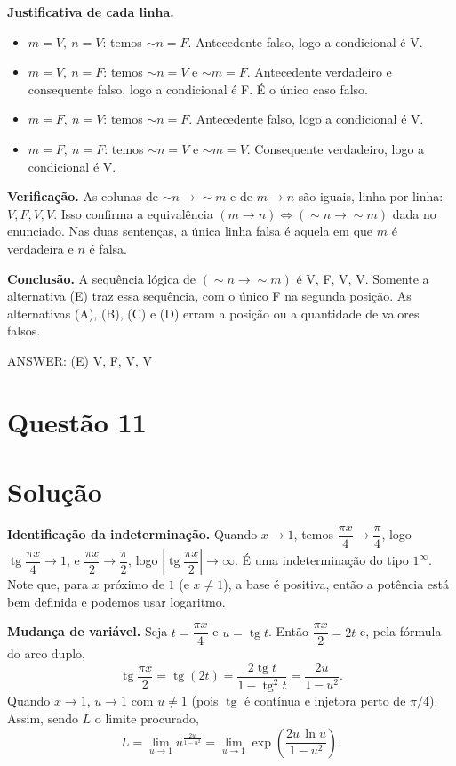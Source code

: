 \documentclass{article}%
\begin{document}
\textbf{Justificativa de cada linha.}
\begin{itemize}
\item $m=V,\ n=V$: temos $\sim n=F$. Antecedente falso, logo a condicional é V.
\item $m=V,\ n=F$: temos $\sim n=V$ e $\sim m=F$. Antecedente verdadeiro e consequente falso, logo a condicional é F. É o único caso falso.
\item $m=F,\ n=V$: temos $\sim n=F$. Antecedente falso, logo a condicional é V.
\item $m=F,\ n=F$: temos $\sim n=V$ e $\sim m=V$. Consequente verdadeiro, logo a condicional é V.
\end{itemize}

\textbf{Verificação.} As colunas de $\sim n\rightarrow\sim m$ e de $m\rightarrow n$ são iguais, linha por linha: $V,F,V,V$. Isso confirma a equivalência $(m\rightarrow n)\Leftrightarrow(\sim n\rightarrow\sim m)$ dada no enunciado. Nas duas sentenças, a única linha falsa é aquela em que $m$ é verdadeira e $n$ é falsa.

\textbf{Conclusão.} A sequência lógica de $(\sim n\rightarrow\sim m)$ é V, F, V, V. Somente a alternativa (E) traz essa sequência, com o único F na segunda posição. As alternativas (A), (B), (C) e (D) erram a posição ou a quantidade de valores falsos.

ANSWER: (E) V, F, V, V%
\newpage%
\section*{Questão 11}

\section*{Solução}

\textbf{Identificação da indeterminação.} Quando $x\to 1$, temos $\dfrac{\pi x}{4}\to\dfrac{\pi}{4}$, logo $\operatorname{tg}\dfrac{\pi x}{4}\to 1$, e $\dfrac{\pi x}{2}\to\dfrac{\pi}{2}$, logo $\left|\operatorname{tg}\dfrac{\pi x}{2}\right|\to\infty$. É uma indeterminação do tipo $1^{\infty}$. Note que, para $x$ próximo de $1$ (e $x\neq 1$), a base é positiva, então a potência está bem definida e podemos usar logaritmo.

\textbf{Mudança de variável.} Seja $t=\dfrac{\pi x}{4}$ e $u=\operatorname{tg} t$. Então $\dfrac{\pi x}{2}=2t$ e, pela fórmula do arco duplo,
\[
\operatorname{tg}\frac{\pi x}{2}=\operatorname{tg}(2t)=\frac{2\operatorname{tg} t}{1-\operatorname{tg}^2 t}=\frac{2u}{1-u^2}.
\]
Quando $x\to 1$, $u\to 1$ com $u\neq 1$ (pois $\operatorname{tg}$ é contínua e injetora perto de $\pi/4$). Assim, sendo $L$ o limite procurado,
\[
L=\lim_{u\to 1} u^{\frac{2u}{1-u^2}}=\lim_{u\to 1}\exp\!\left(\frac{2u\,\ln u}{1-u^2}\right).
\]
\end{document}
